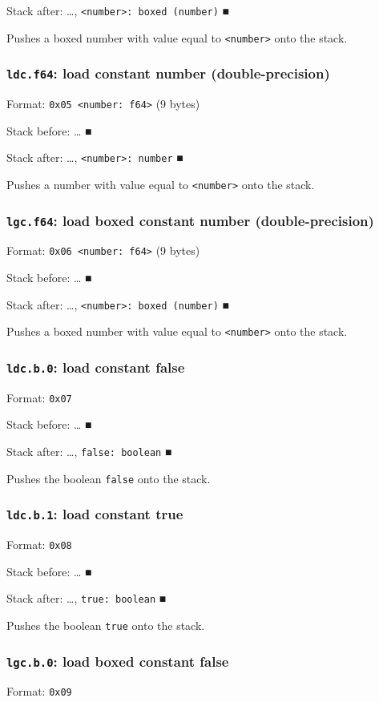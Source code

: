 Stack after: \ldots{}​, \texttt{<number>: boxed (number)} ■

Pushes a boxed number with value equal to \texttt{<number>} onto the stack.

\subsubsection{\texttt{ldc.f64}: load constant number (double-precision)}
\label{sec:org6bba761}
Format: \texttt{0x05 <number: f64>} (9 bytes)

Stack before: \ldots{}​ ■

Stack after: \ldots{}​, \texttt{<number>: number} ■

Pushes a number with value equal to \texttt{<number>} onto the stack.

\subsubsection{\texttt{lgc.f64}: load boxed constant number (double-precision)}
\label{sec:orgae88789}
Format: \texttt{0x06 <number: f64>} (9 bytes)

Stack before: \ldots{}​ ■

Stack after: \ldots{}​, \texttt{<number>: boxed (number)} ■

Pushes a boxed number with value equal to \texttt{<number>} onto the stack.

\subsubsection{\texttt{ldc.b.0}: load constant false}
\label{sec:org628c82c}
Format: \texttt{0x07}

Stack before: \ldots{}​ ■

Stack after: \ldots{}​, \texttt{false: boolean} ■

Pushes the boolean \texttt{false} onto the stack.

\subsubsection{\texttt{ldc.b.1}: load constant true}
\label{sec:org45a4edf}
Format: \texttt{0x08}

Stack before: \ldots{}​ ■

Stack after: \ldots{}​, \texttt{true: boolean} ■

Pushes the boolean \texttt{true} onto the stack.

\subsubsection{\texttt{lgc.b.0}: load boxed constant false}
\label{sec:orgdf93d05}
Format: \texttt{0x09}

